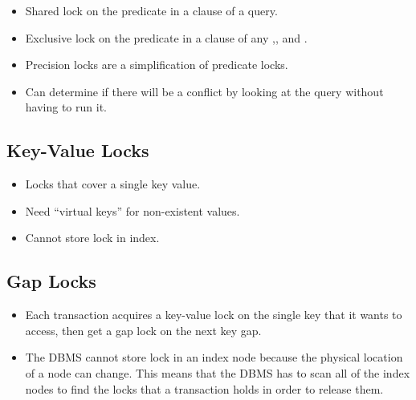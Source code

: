 \documentclass[11pt]{article}
\begin{document}
\begin{itemize}
    \item
    Shared lock on the predicate in a  clause of a  query.
    
    \item
    Exclusive lock on the predicate in a  clause of any ,, 
    and .
    
    \item
    Precision locks are a simplification of predicate locks.
    
    \item
    Can determine if there will be a conflict by looking at the query without having to run it.
\end{itemize}

\subsection*{Key-Value Locks}
\begin{itemize}
    \item Locks that cover a single key value.
    \item Need ``virtual keys'' for non-existent values.
    \item Cannot store lock in index.
\end{itemize}

\subsection*{Gap Locks}
\begin{itemize}
    \item
    Each transaction acquires a key-value lock on the single key that it wants to access, then get 
    a gap lock on the next key gap.
    
    \item
    The DBMS cannot store lock in an index node because the physical location of a node can change.
    This means that the DBMS has to scan all of the index nodes to find the locks that a 
    transaction holds in order to release them.
\end{itemize}

\end{document}
